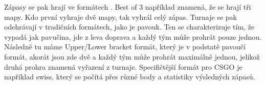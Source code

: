 Zápasy se pak hrají ve formátech . Best of 3 například znamená, že se hrají tři mapy.
{\color{red}
Kdo první vyhraje dvě mapy, tak vyhrál celý zápas.
} Turnaje se pak odehrávají v tradičních
formátech, jako je pavouk. Ten se charakterizuje tím, že vypadá jak pavučina, jde z leva doprava a každý tým může prohrát pouze jednou. Následně tu máme
Upper/Lower bracket formát, který je v podstatě pavoučí formát, akorát jsou zde dvě  a každý tým může prohrát maximálně jednou, jelikož druhá prohra
znamená vyřazení z turnaje. Specifičtější formát pro \ac{CSGO} je například swiss, který se počítá přes různé body a statistiky výsledných zápasů.